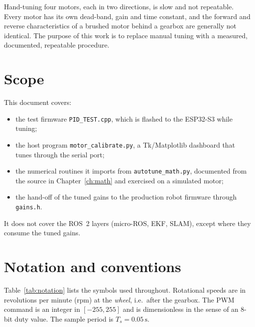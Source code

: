 \documentclass[11pt,a4paper]{report}
\newcommand{\code}[1]{\texttt{#1}}
\begin{document}
Hand-tuning four motors, each in two directions, is slow and not repeatable. Every motor has its own dead-band, gain and time constant, and the forward and reverse characteristics of a brushed motor behind a gearbox are generally not identical. The purpose of this work is to replace manual tuning with a measured, documented, repeatable procedure.

\section{Scope}
This document covers:
\begin{itemize}[noitemsep]
  \item the test firmware \code{PID\_TEST.cpp}, which is flashed to the ESP32-S3 while tuning;
  \item the host program \code{motor\_calibrate.py}, a Tk/Matplotlib dashboard that tunes through the serial port;
  \item the numerical routines it imports from \code{autotune\_math.py}, documented from the source in Chapter~\ref{ch:math} and exercised on a simulated motor;
  \item the hand-off of the tuned gains to the production robot firmware through \code{gains.h}.
\end{itemize}
It does not cover the ROS~2 layers (micro-ROS, EKF, SLAM), except where they consume the tuned gains.

\section{Notation and conventions}
Table~\ref{tab:notation} lists the symbols used throughout. Rotational speeds are in revolutions per minute (rpm) at the \emph{wheel}, i.e.\ after the gearbox. The PWM command is an integer in $[-255,255]$ and is dimensionless in the sense of an 8-bit duty value. The sample period is $T_s = 0.05\,\mathrm{s}$.
\end{document}

